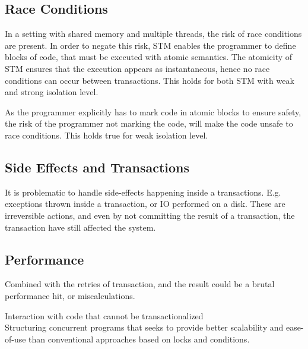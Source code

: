 \subsection{Race Conditions}
In a setting with shared memory and multiple threads, the risk of race conditions are present. In order to negate this risk, \ac{STM} enables the programmer to define blocks of code, that must be executed with atomic semantics. The atomicity of \ac{STM} ensures that the execution appears as instantaneous, hence no race conditions can occur between transactions. This holds for both \ac{STM} with weak and strong isolation level.

As the programmer explicitly has to mark code in atomic blocks to ensure safety, the risk of the programmer not marking the code, will make the code unsafe to race conditions. This holds true for weak isolation level.




\subsection{Side Effects and Transactions}
It is problematic to handle side-effects happening inside a transactions. E.g. exceptions thrown inside a transaction, or \ac{IO} performed on a disk. These are irreversible actions, and even by not committing the result of a transaction, the transaction have still affected the system. 

\subsection{Performance}
Combined with the retries of transaction, and the result could be a brutal performance hit, or miscalculations.

Interaction with code that cannot be transactionalized\\

Structuring concurrent programs that seeks to provide better scalability and ease-of-use than conventional approaches based on locks and conditions.

